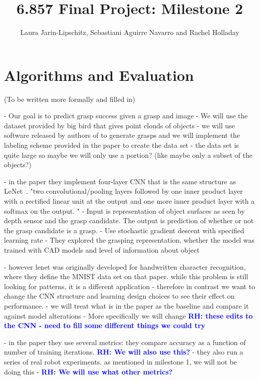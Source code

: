 \documentclass[letterpaper, 10 pt]{article}
\newcommand{\rhnote}[1]{\ifthenelse{\boolean{include-notes}}%
 {\textcolor{blue}{\textbf{RH: #1}}}{}}
\begin{document}
\title{6.857 Final Project: Milestone 2}
\author{Laura Jarin-Lipschitz, Sebastiani Aguirre Navarro and Rachel Holladay}
\maketitle

\section{Algorithms and Evaluation}

(To be written more formally and filled in)

- Our goal is to predict grasp success given a grasp and image
- We will use the dataset provided by big bird\cite{singh2014bigbird} that gives point clouds of objects
- we will use software released by authors of \cite{pas2017grasp} to generate grasps and we will implement the labeling scheme provided in the paper to create the data set
- the data set is quite large so maybe we will only use a portion? (like maybe only a subset of the objects?)

- in the paper they implement four-layer CNN that is the same structure as LeNet~\cite{lecun1998gradient}. "two convolutional/pooling layers followed by one inner product layer with a rectified linear unit at the output and one more inner product layer with a softmax on the output. "
- Input is representation of object surfaces as seen by depth sensor and the grasp candidate. The output is prediction of whether or not the grasp candidate is a grasp. 
- Use stochastic gradient descent with specified learning rate
- They explored the grasping representation, whether the model was trained with CAD models and level of information about object

- however lenet was originally developed for handwritten character recognition, where they define the MNIST data set on that paper. while this problem is still looking for patterns, it is a different application
- therefore in contrast we want to change the CNN structure and learning design choices to see their effect on performance. 
- we will treat what is in the paper as the baseline and compare it against model alterations
- More specifically we will change \rhnote{these edits to the CNN - need to fill some different things we could try}

- in the paper they use several metrics: they compare accuracy as a function of number of training iterations. \rhnote{We will also use this?}
- they also run a series of real robot experiments. as mentioned in milestone 1, we will not be doing this
- \rhnote{We will use what other metrics?}
\end{document}
